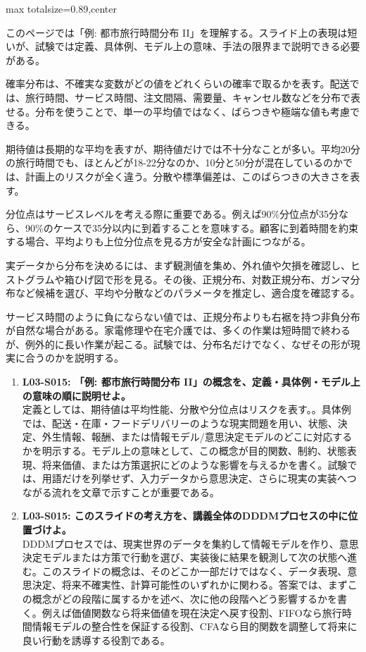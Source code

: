 \begin{minipage}[t]{0.58\textwidth}
\begin{adjustbox}{max totalsize={\textwidth}{0.89\textheight},center}
\begin{minipage}{\textwidth}\scriptsize
{}このページでは「例: 都市旅行時間分布 II」を理解する。スライド上の表現は短いが、試験では定義、具体例、モデル上の意味、手法の限界まで説明できる必要がある。\par
確率分布は、不確実な変数がどの値をどれくらいの確率で取るかを表す。配送では、旅行時間、サービス時間、注文間隔、需要量、キャンセル数などを分布で表せる。分布を使うことで、単一の平均値ではなく、ばらつきや極端な値も考慮できる。\par
期待値は長期的な平均を表すが、期待値だけでは不十分なことが多い。平均20分の旅行時間でも、ほとんどが18-22分なのか、10分と50分が混在しているのかでは、計画上のリスクが全く違う。分散や標準偏差は、このばらつきの大きさを表す。\par
分位点はサービスレベルを考える際に重要である。例えば90\%分位点が35分なら、90\%のケースで35分以内に到着することを意味する。顧客に到着時間を約束する場合、平均よりも上位分位点を見る方が安全な計画につながる。\par
実データから分布を決めるには、まず観測値を集め、外れ値や欠損を確認し、ヒストグラムや箱ひげ図で形を見る。その後、正規分布、対数正規分布、ガンマ分布など候補を選び、平均や分散などのパラメータを推定し、適合度を確認する。\par
サービス時間のように負にならない値では、正規分布よりも右裾を持つ非負分布が自然な場合がある。家電修理や在宅介護では、多くの作業は短時間で終わるが、例外的に長い作業が起こる。試験では、分布名だけでなく、なぜその形が現実に合うのかを説明する。\par{}\begin{enumerate}\item \textbf{L03-S015: 「例: 都市旅行時間分布 II」の概念を、定義・具体例・モデル上の意味の順に説明せよ。}\\定義としては、期待値は平均性能、分散や分位点はリスクを表す。。具体例では、配送・在庫・フードデリバリーのような現実問題を用い、状態、決定、外生情報、報酬、または情報モデル/意思決定モデルのどこに対応するかを明示する。モデル上の意味として、この概念が目的関数、制約、状態表現、将来価値、または方策選択にどのような影響を与えるかを書く。試験では、用語だけを列挙せず、入力データから意思決定、さらに現実の実装へつながる流れを文章で示すことが重要である。\item \textbf{L03-S015: このスライドの考え方を、講義全体のDDDMプロセスの中に位置づけよ。}\\DDDMプロセスでは、現実世界のデータを集約して情報モデルを作り、意思決定モデルまたは方策で行動を選び、実装後に結果を観測して次の状態へ進む。このスライドの概念は、そのどこか一部だけではなく、データ表現、意思決定、将来不確実性、計算可能性のいずれかに関わる。答案では、まずこの概念がどの段階に属するかを述べ、次に他の段階へどう影響するかを書く。例えば価値関数なら将来価値を現在決定へ戻す役割、FIFOなら旅行時間情報モデルの整合性を保証する役割、CFAなら目的関数を調整して将来に良い行動を誘導する役割である。\end{enumerate}

\end{minipage}
\end{adjustbox}
\end{minipage}
